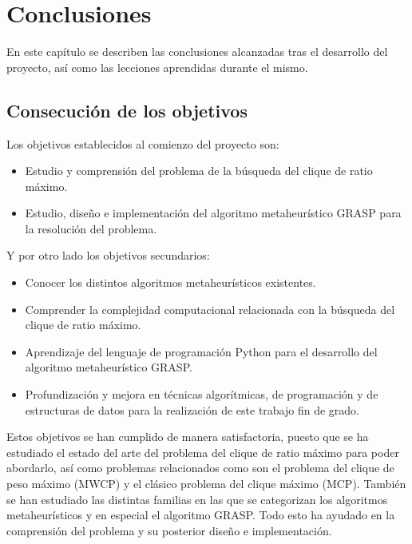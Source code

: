 
\chapter{Conclusiones} %

\label{Chapter6} %


En este capítulo se describen las conclusiones alcanzadas tras el desarrollo del proyecto, así como las lecciones aprendidas durante el mismo.

\section{Consecución de los objetivos}

Los objetivos establecidos al comienzo del proyecto son:

\begin{itemize}
	\item Estudio y comprensión del problema de la búsqueda del clique de ratio máximo.
	\item Estudio, diseño e implementación del algoritmo metaheurístico GRASP para la resolución del problema.
\end{itemize}

Y por otro lado los objetivos secundarios:
\begin{itemize}
	\item Conocer los distintos algoritmos metaheurísticos existentes.
	\item Comprender la complejidad computacional relacionada con la búsqueda del clique de ratio máximo.
	\item Aprendizaje del lenguaje de programación Python para el desarrollo del algoritmo metaheurístico \gls{GRASP}.
	\item Profundización y mejora en técnicas algorítmicas, de programación y de estructuras de datos para la realización de este trabajo fin de grado.
\end{itemize}

Estos objetivos se han cumplido de manera satisfactoria, puesto que se ha estudiado el estado del arte del problema del clique de ratio máximo para poder abordarlo, así como problemas relacionados como son el problema del clique de peso máximo (\gls{MWCP}) y el clásico problema del clique máximo (\gls{MCP}).
También se han estudiado las distintas familias en las que se categorizan los algoritmos metaheurísticos y en especial el algoritmo \gls{GRASP}.
Todo esto ha ayudado en la comprensión del problema y su posterior diseño e implementación.

